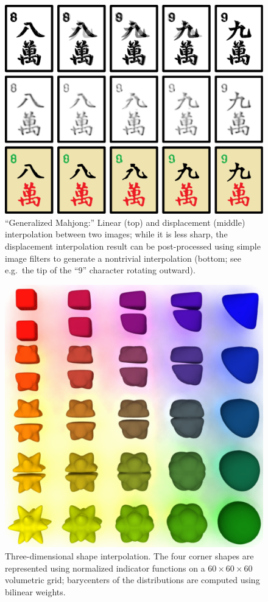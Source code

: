 \begin{figure}[t]
\centering
\includegraphics[width=.75\linewidth]{figures/mahjong/mahjong.pdf}
\caption{``Generalized Mahjong:'' Linear (top) and displacement (middle) interpolation between two images; while it is less sharp, the displacement interpolation result can be post-processed using simple image filters to generate a nontrivial interpolation (bottom; see e.g.\ the tip of the ``9'' character rotating outward).\vspace{-.2in}}\label{fig:mahjong}
\end{figure}

\begin{figure}[t]\centering
\includegraphics[width=\linewidth]{figures/volumetric_interp/gridinterp.pdf}
\caption{Three-dimensional shape interpolation. The four corner shapes are represented using normalized indicator functions on a $60\!\times\!60\!\times\!60$ volumetric grid; barycenters of the distributions are computed using bilinear weights.}\label{fig:shape_interpolation_3d}
\end{figure}

